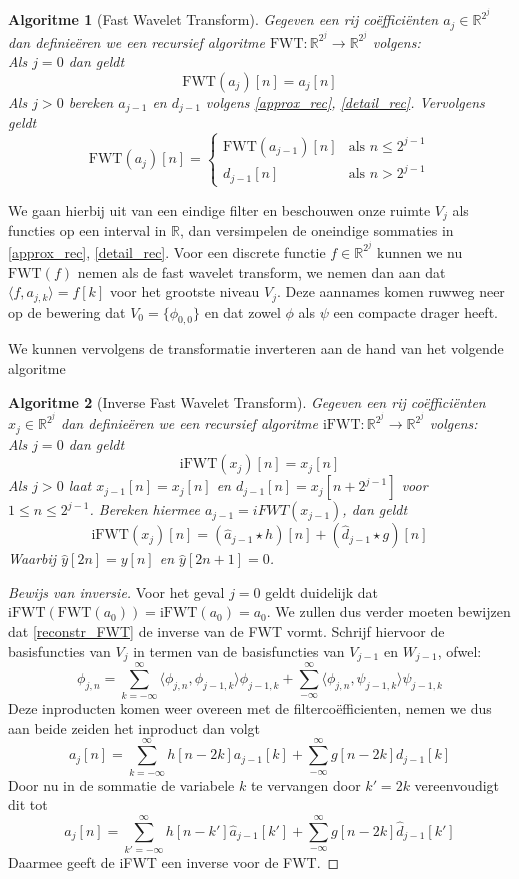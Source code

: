 \documentclass[11pt]{report}
\newcommand{\R}{\mathbb{R}}
\theoremstyle{plain}
\newtheorem*{algo}{Algoritme}
\theoremstyle{remark}
\newcommand{\inpr}[2]{\langle #1 , #2 \rangle}
\begin{document}
\begin{algo}[Fast Wavelet Transform]
Gegeven een rij co\"effici\"enten $a_j\in\R^{2^j}$ dan definie\"eren we een recursief 
algoritme $\textrm{FWT}:\R^{2^j}\to\R^{2^j}$ volgens:\\
Als $j=0$ dan geldt
\[
\textrm{FWT}(a_j)[n] = a_j[n]
\]
Als $j>0$ bereken $a_{j-1}$ en $d_{j-1}$ volgens \ref{approx_rec}, \ref{detail_rec}.
Vervolgens geldt
\[
\textrm{FWT}(a_j)[n] = \begin{cases} 
\textrm{FWT}(a_{j-1})[n] & \text{als } n\leq 2^{j-1} \\
d_{j-1}[n] & \text{als } n>2^{j-1} \end{cases}
\]
\end{algo}
We gaan hierbij uit van een eindige filter en beschouwen onze ruimte $V_j$ als functies
op een interval in $\R$, dan versimpelen de oneindige sommaties in \ref{approx_rec},
\ref{detail_rec}. Voor een discrete functie $f\in\R^{2^j}$ kunnen we nu 
$\mathrm{FWT}(f)$ nemen als de fast wavelet transform, 
we nemen dan aan dat $\inpr{f}{a_{j,k}} = f[k]$ voor het
grootste niveau $V_j$. Deze aannames komen ruwweg neer op de bewering dat 
$V_0 = \{\phi_{0,0}\}$ en dat zowel $\phi$ als $\psi$ een compacte drager heeft.

We kunnen vervolgens de transformatie inverteren aan de hand van het volgende algoritme
\begin{algo}[Inverse Fast Wavelet Transform]
Gegeven een rij co\"effici\"enten $x_j\in\R^{2^j}$ dan definie\"eren we een recursief 
algoritme $\textrm{iFWT}:\R^{2^j}\to\R^{2^j}$ volgens:\\
Als $j=0$ dan geldt
\[
\textrm{iFWT}(x_j)[n] = x_j[n]
\]
Als $j>0$ laat $x_{j-1}[n] = x_j[n]$ en $d_{j-1}[n] = x_j[n+2^{j-1}]$ voor 
$1\leq n\leq 2^{j-1}$. Bereken hiermee $a_{j-1} = iFWT(x_{j-1})$,
dan geldt
\begin{equation}
\label{reconstr_FWT}
\textrm{iFWT}(x_j)[n] = (\hat a_{j-1}\star h)[n] + (\hat d_{j-1}\star g)[n]
\end{equation}
Waarbij $\hat y [2n] = y[n]$ en $\hat y [2n+1] = 0$.  
\end{algo}
\begin{proof}[Bewijs van inversie]
Voor het geval $j=0$ geldt duidelijk dat 
$\textrm{iFWT}(\textrm{FWT}(a_0)) = \textrm{iFWT}(a_0) = a_0$.
We zullen dus verder moeten bewijzen dat \ref{reconstr_FWT} de inverse van de FWT vormt.
Schrijf hiervoor de basisfuncties van $V_j$ in termen van de basisfuncties van $V_{j-1}$
en $W_{j-1}$, ofwel:
\[
\phi_{j,n} = \sum_{k=-\infty}^\infty \inpr{\phi_{j,n}}{\phi_{j-1,k}}\phi_{j-1,k}
+ \sum_{-\infty}^\infty \inpr{\phi_{j,n}}{\psi_{j-1,k}}\psi_{j-1,k}
\]
Deze inproducten komen weer overeen met de filterco\"efficienten, nemen we dus aan 
beide zeiden het inproduct dan volgt
\[
a_j[n] = \sum_{k=-\infty}^\infty h[n-2k]a_{j-1}[k]
+ \sum_{-\infty}^\infty g[n-2k]d_{j-1}[k]
\]
Door nu in de sommatie de variabele $k$ te vervangen door $k'=2k$ vereenvoudigt dit tot
\[
a_j[n] = \sum_{k'=-\infty}^\infty h[n-k']\hat a_{j-1}[k']
+ \sum_{-\infty}^\infty g[n-2k]\hat d_{j-1}[k']
\]
Daarmee geeft de iFWT een inverse voor de FWT.
\end{proof}
\end{document}
